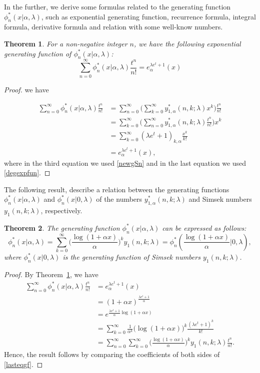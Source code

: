 \documentclass{amsart}
\newtheorem{theorem}{Theorem}[section]
\numberwithin{equation}{section}
\theoremstyle{definition}
\theoremstyle{remark}
\begin{document}
In the further, we derive some formulas related to the generating function $\phi^{*}_{n}(x|\alpha,\lambda)$, such as exponential generating function, recurrence formula, integral formula, derivative formula and relation with some well-know numbers.
\begin{theorem}\label{gfphi}
For a  non-negative integer $n$, we have the following exponential generating function of $\phi^{*}_{n}(x|\alpha,\lambda)$:
   \begin{equation}\label{exgefphi}
    \sum_{n=0}^{\infty}\phi_{n}^{*}(x|\alpha,\lambda)\frac{t^n}{n!}=e_{\alpha}^{\lambda e^t+1}(x)   
   \end{equation}
\end{theorem}
\begin{proof} we have

    \begin{align}
        \sum_{n=0}^{\infty}\phi_{n}^{*}(x|\alpha,\lambda)\frac{t^n}{n!}        &=\sum_{n=0}^{\infty}\Big(\sum_{k=0}^{\infty}y_{1,\alpha}^{*}(n,k;\lambda)x^k\Big)\frac{t^n}{n!}\\
        &=\sum_{k=0}^{\infty}\Big(\sum_{n=0}^{\infty}y_{1,\alpha}^{*}(n,k;\lambda)\frac{t^n}{n!}\Big)x^k\\
        &=\sum_{k=0}^{\infty}(\lambda e^t+1)_{k,\alpha}\frac{x^k}{k!}\\
        &=e_{\alpha}^{\lambda e^t+1}(x),
    \end{align}
where in the third equation we used \eqref{newgSn} and in the last equation we used \eqref{degexpfun}.
\end{proof}
The following result, describe a relation between the generating functions $\phi_{n}^{*}(x|\alpha,\lambda)$ and $\phi_{n}^{*}(x|0,\lambda)$ of the numbers $y_{1,\alpha}^{*}(n,k;\lambda)$ and Simsek numbers $y_{1}(n,k;\lambda)$, respectively.
\begin{theorem}
The generating function $\phi_{n}^{*}(x|\alpha,\lambda)$ can be expressed as follows:
    $$\phi_{n}^{*}(x|\alpha,\lambda)=\sum_{k=0}^{\infty}\bigg(\frac{\log(1+\alpha x)}{\alpha}\bigg)^{k}y_{1}(n,k;\lambda)=\phi_{n}^{*}\left(\frac{\log(1+\alpha x)}{\alpha}|0,\lambda\right),$$
    where $\phi_{n}^{*}(x|0,\lambda)$ is the generating function of Simsek numbers $y_{1}(n,k;\lambda)$.
\end{theorem}
\begin{proof}
By Theorem~\ref{gfphi}, we have
\begin{align}
    \sum_{n=0}^{\infty}\phi_{n}^{*}(x|\alpha,\lambda)\frac{t^n}{n!}&=e_{\alpha}^{\lambda e^t+1}(x)\\
    &=(1+\alpha x)^{\frac{\lambda e^t+1}{\alpha}}\\
    &=e^{\frac{\lambda e^t+1}{\alpha}\log(1+\alpha x)}\\
    &=\sum_{k=0}^{\infty}\frac{1}{\alpha^k}\big(\log(1+\alpha x)\big)^k\frac{(\lambda e^t+1)^k}{k!}\\
    &=\sum_{n=0}^{\infty}\sum_{k=0}^{\infty}\Big(\frac{\log(1+\alpha x)}{\alpha}\Big)^{k}y_{1}(n,k;\lambda)\frac{t^n}{n!}\label{lasteqgf}.
\end{align}
Hence, the result follows by comparing the coefficients of both sides of \eqref{lasteqgf}.
\end{proof}
\end{document}
